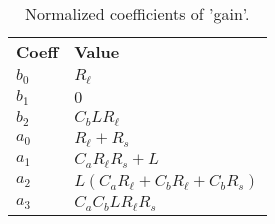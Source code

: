 \begin{table}[H]
\centering
\begin{tabular}[c]{ll}
\textbf{Coeff} & \textbf{Value} \\ 
\rowcolor{myyellow}
$b_{0}$ &$R_{\ell}$ \\ 
$b_{1}$ &$0$ \\ 
\rowcolor{myyellow}
$b_{2}$ &$C_{b} L R_{\ell}$ \\ 
$a_{0}$ &$R_{\ell} + R_{s}$ \\ 
\rowcolor{myyellow}
$a_{1}$ &$C_{a} R_{\ell} R_{s} + L$ \\ 
$a_{2}$ &$L \left(C_{a} R_{\ell} + C_{b} R_{\ell} + C_{b} R_{s}\right)$ \\ 
\rowcolor{myyellow}
$a_{3}$ &$C_{a} C_{b} L R_{\ell} R_{s}$ \\ 
\end{tabular}
\caption{Normalized coefficients of 'gain'.}
\end{table}

